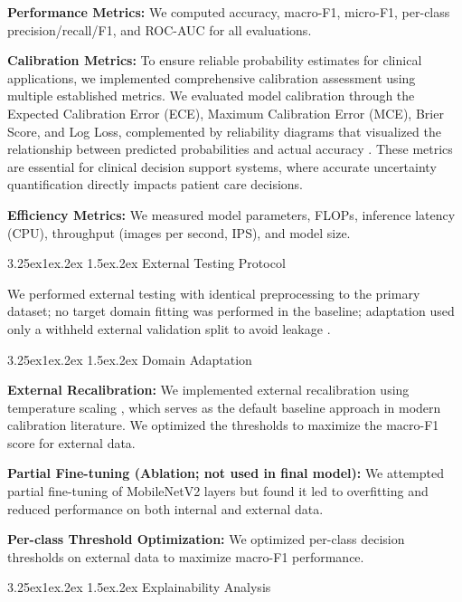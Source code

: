 \documentclass[conference]{IEEEtran}
\makeatletter
\renewcommand{\subsection}{%
  \@startsection{subsection}{2}{\z@}%
  {3.25ex\@plus1ex\@minus.2ex}%
  {1.5ex\@plus.2ex}%
  {\normalfont}%
}
\makeatother
\begin{document}
\textbf{Performance Metrics:} We computed accuracy, macro-F1, micro-F1, per-class precision/recall/F1, and ROC-AUC for all evaluations.

\textbf{Calibration Metrics:} To ensure reliable probability estimates for clinical applications, we implemented comprehensive calibration assessment using multiple established metrics. We evaluated model calibration through the Expected Calibration Error (ECE), Maximum Calibration Error (MCE), Brier Score, and Log Loss, complemented by reliability diagrams that visualized the relationship between predicted probabilities and actual accuracy \cite{guo2017}. These metrics are essential for clinical decision support systems, where accurate uncertainty quantification directly impacts patient care decisions.

\textbf{Efficiency Metrics:} We measured model parameters, FLOPs, inference latency (CPU), throughput (images per second, IPS), and model size.

\subsection{\normalfont External Testing Protocol}

We performed external testing with identical preprocessing to the primary dataset; no target domain fitting was performed in the baseline; adaptation used only a withheld external validation split to avoid leakage \cite{kim2019, zech2018}.

\subsection{\normalfont Domain Adaptation}

\textbf{External Recalibration:} We implemented external recalibration using temperature scaling \cite{guo2017}, which serves as the default baseline approach in modern calibration literature. We optimized the thresholds to maximize the macro-F1 score for external data.

\textbf{Partial Fine-tuning (Ablation; not used in final model):} We attempted partial fine-tuning of MobileNetV2 layers but found it led to overfitting and reduced performance on both internal and external data.

\textbf{Per-class Threshold Optimization:} We optimized per-class decision thresholds on external data to maximize macro-F1 performance.

\subsection{\normalfont Explainability Analysis}
\end{document}
